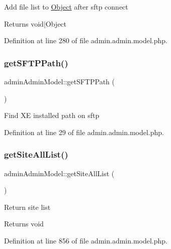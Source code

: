 Add file list to \hyperlink{classObject}{Object} after sftp connect \begin{DoxyReturn}{Returns}
void$\vert$\+Object 
\end{DoxyReturn}


Definition at line 280 of file admin.\+admin.\+model.\+php.

\hypertarget{classadminAdminModel_aaeac1a0a11439dfb4faa74751da8747e}{}\label{classadminAdminModel_aaeac1a0a11439dfb4faa74751da8747e} 
\subsubsection{\texorpdfstring{get\+S\+F\+T\+P\+Path()}{getSFTPPath()}}
{\footnotesize\ttfamily admin\+Admin\+Model\+::get\+S\+F\+T\+P\+Path (\begin{DoxyParamCaption}{ }\end{DoxyParamCaption})}

Find XE installed path on sftp 

Definition at line 29 of file admin.\+admin.\+model.\+php.

\hypertarget{classadminAdminModel_a12f25a1c61e11bf727019171564b1cad}{}\label{classadminAdminModel_a12f25a1c61e11bf727019171564b1cad} 
\subsubsection{\texorpdfstring{get\+Site\+All\+List()}{getSiteAllList()}}
{\footnotesize\ttfamily admin\+Admin\+Model\+::get\+Site\+All\+List (\begin{DoxyParamCaption}{ }\end{DoxyParamCaption})}

Return site list \begin{DoxyReturn}{Returns}
void 
\end{DoxyReturn}


Definition at line 856 of file admin.\+admin.\+model.\+php.

\hypertarget{classadminAdminModel_aed8487a6deb0041ea43b2cd66a6339c0}{}\label{classadminAdminModel_aed8487a6deb0041ea43b2cd66a6339c0} 
